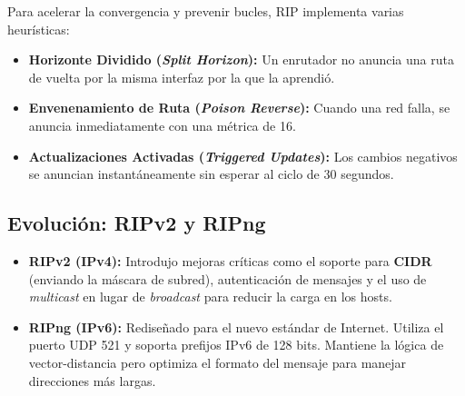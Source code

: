 Para acelerar la convergencia y prevenir bucles, RIP implementa varias heurísticas:

\begin{itemize}
	\item \textbf{Horizonte Dividido (\textit{Split Horizon}):} Un enrutador no anuncia una ruta de vuelta por la misma interfaz por la que la aprendió.
	\item \textbf{Envenenamiento de Ruta (\textit{Poison Reverse}):} Cuando una red falla, se anuncia inmediatamente con una métrica de 16.
	\item \textbf{Actualizaciones Activadas (\textit{Triggered Updates}):} Los cambios negativos se anuncian instantáneamente sin esperar al ciclo de 30 segundos.
\end{itemize}

\subsection{Evolución: RIPv2 y RIPng}

\begin{itemize}
    \item \textbf{RIPv2 (IPv4):} Introdujo mejoras críticas como el soporte para \textbf{CIDR} (enviando la máscara de subred), autenticación de mensajes y el uso de \textit{multicast} en lugar de \textit{broadcast} para reducir la carga en los hosts.
    \item \textbf{RIPng (IPv6):} Rediseñado para el nuevo estándar de Internet. Utiliza el puerto UDP 521 y soporta prefijos IPv6 de 128 bits. Mantiene la lógica de vector-distancia pero optimiza el formato del mensaje para manejar direcciones más largas.
\end{itemize}

